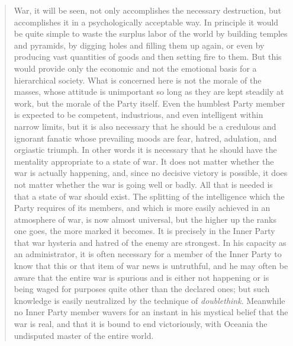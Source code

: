 \begin{quotation}
War, it will be seen, not only accomplishes the necessary destruction,
but accomplishes it in a psychologically acceptable way. In principle it
would be quite simple to waste the surplus labor of the world by
building temples and pyramids, by digging holes and filling them up
again, or even by producing vast quantities of goods and then setting
fire to them. But this would provide only the economic and not the
emotional basis for a hierarchical society. What is concerned here is
not the morale of the masses, whose attitude is unimportant so long as
they are kept steadily at work, but the morale of the Party itself. Even
the humblest Party member is expected to be competent, industrious, and
even intelligent within narrow limits, but it is also necessary that he
should be a credulous and ignorant fanatic whose prevailing moods are
fear, hatred, adulation, and orgiastic triumph. In other words it is
necessary that he should have the mentality appropriate to a state of
war. It does not matter whether the war is actually happening, and,
since no decisive victory is possible, it does not matter whether the
war is going well or badly. All that is needed is that a state of war
should exist. The splitting of the intelligence which the Party requires
of its members, and which is more easily achieved in an atmosphere of
war, is now almost universal, but the higher up the ranks one goes, the
more marked it becomes. It is precisely in the Inner Party that war
hysteria and hatred of the enemy are strongest. In his capacity as an
administrator, it is often necessary for a member of the Inner Party to
know that this or that item of war news is untruthful, and he may often
be aware that the entire war is spurious and is either not happening or
is being waged for purposes quite other than the declared ones; but such
knowledge is easily neutralized by the technique of \emph{doublethink}.
Meanwhile no Inner Party member wavers for an instant in his mystical
belief that the war is real, and that it is bound to end victoriously,
with Oceania the undisputed master of the entire world.
\end{quotation}

